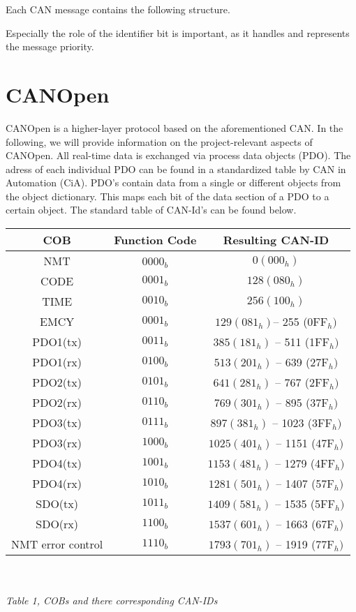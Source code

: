 Each CAN message contains the following structure.

Especially the role of the identifier bit is important, as it handles and represents the message priority.

\pagebreak

\section{CANOpen}

CANOpen is a higher-layer protocol based on the aforementioned CAN. In the following, we will provide information on the project-relevant aspects of CANOpen.
All real-time data is exchanged via process data objects (PDO). The adress of each individual PDO can be found in a standardized table by CAN in Automation (CiA). PDO's contain data from a single or different objects from the object dictionary. This maps each bit of the data section of a PDO to a certain object. The standard table of CAN-Id's can be found below.
\\

\begin{tabular}{|c|c|c|}
	\hline 
	\textbf{COB} & \textbf{Function Code} & \textbf{Resulting CAN-ID} \\ 
	\hline 
	NMT &  0000$_{b}$  & $0 (000_{h})$  \\ 
	\hline 
	CODE & $0001_{b}$ &  $128 (080_{h})$\\ 
	\hline 
	TIME & $0010_{b}$ &  $256 (100_{h})$\\ 
	\hline 
	EMCY & $0001_{b}$ &   $129 (081_{h}) $–  255 (0FF$_{h})$ \\ 
	\hline 
	PDO1(tx) & $0011_{b}$ &  $385 (181_{h}) $ – 511 (1FF$_{h})$\\ 
	\hline 
	PDO1(rx) & $0100_{b}$ &  $513 (201_{h}) $ –  639 (27F$_{h})$\\ 
	\hline 
	PDO2(tx) & $0101_{b}$ &  $641 (281_{h}) $ –  767 (2FF$_{h})$\\ 
	\hline 
	PDO2(rx) & $0110_{b}$ &  $769 (301_{h})$  –  895 (37F$_{h})$\\ 
	\hline 
	PDO3(tx) & $0111_{b}$ &  $897 (381_{h}) $ – 1023 (3FF$_{h})$\\ 
	\hline 
	PDO3(rx) & $1000_{b}$ &  $1025 (401_{h}) $ –  1151 (47F$_{h})$\\ 
	\hline 
	PDO4(tx) & $1001_{b}$ &  $1153 (481_{h}) $ –  1279 (4FF$_{h})$\\ 
	\hline 
	PDO4(rx) & $1010_{b}$ & $1281 (501_{h}) $ –  1407 (57F$_{h})$\\ 
	\hline 
	SDO(tx) & $1011_{b}$ & $ 1409 (581_{h}) $ –  1535 (5FF$_{h})$\\ 
	\hline 
	SDO(rx) & $1100_{b}$ & $1537 (601_{h}) $ –  1663 (67F$_{h})$\\ 
	\hline 
	NMT error control &$ 1110_{b} $& $ 1793 (701_{h}) $ –  1919 (77F$_{h})$\\ 
	\hline 
\end{tabular} 
\\
\\
\textit{Table 1, COBs and there corresponding CAN-IDs}

